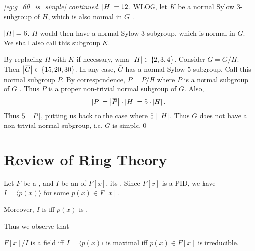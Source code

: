 \documentclass[notoc,notitlepage]{tufte-book}
\begin{document}
\begin{proof}[\cref{eg:g_60_is_simple} continued]
   $\left|H\right| = 12$. WLOG, let $K$ be a normal Sylow $3$-subgroup
  of $H$, which is also normal in $G$ .

  \noindent
   $\left|H\right| = 6$. $H$ would then have a normal Sylow $3$-subgroup,
  which is normal in $G$. We shall also call this subgroup $K$.

  \noindent
  By replacing $H$ with $K$ if necessary, wma $\left| H \right| \in \left\{ 2, 3, 4 \right\}$.
  Consider $\bar{G} = G / H$. Then $\abs{ \bar{G} } \in \left\{ 15, 20, 30 \right\}$.
  In any case, $\bar{G}$ has a normal Sylow $5$-subgroup. Call this normal subgroup 
  $\bar{P}$. By \hyperref[thm:correspondence_theorem]{correspondence}, $\bar{P} = P / H$
  where $P$ is a normal subgroup of $G$ . Thus $P$ is a proper non-trivial normal subgroup of $G$.
  Also,
  \begin{equation*}
    \abs{ P } = \abs{ \bar{P} } \cdot \abs{ H } = 5 \cdot \abs{ H }.
  \end{equation*}
  Thus $5 \mid \left| P \right|$, putting us back to the case where $5 \mid \left| H \right|$.
  Thus $G$ does not have a non-trivial normal subgroup, i.e. $G$ is simple.\qed\
\end{proof}


\section{Review of Ring Theory}%
\label{sec:review_of_ring_theory}

Let $F$ be a , and $I$ be an  of $F[x]$, its
\hlnotea{polynomial ring}. Since $F[x]$ is a PID, we have $I = \langle p(x) \rangle$
for some $p(x) \in F[x]$.

Moreover, $I$ is  iff $p(x)$ is .

Thus we observe that
\begin{center}
  $F[x]/I$ is a field iff $I = \langle p(x) \rangle$ is maximal iff $p(x) \in F[x]$ is irreducible.
\end{center}
\end{document}
